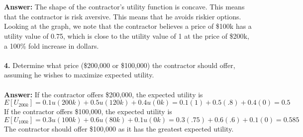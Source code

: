 \documentclass[12pt]{article}
\begin{document}
\\~\\
\textbf{Answer: } The shape of the contractor's utility function is concave. This means that the contractor is risk aversive. This means that he avoids riskier options. Looking at the graph, we note that the contractor believes a price of \$100k has a utility value of 0.75, which is close to the utility value of 1 at the price of \$200k, a 100\% fold increase in dollars. 
\\~\\
\textbf{4. } Determine what price (\$200,000 or \$100,000) the contractor should offer, assuming he wishes to maximize expected utility. 
\\~\\
\textbf{Answer: } If the contractor offers \$200,000, the expected utility is 
$$ E[U_{200k}] = 0.1u(200k) + 0.5u(120k) + 0.4u(0k) = 0.1(1) + 0.5(.8) + 0.4(0) = 0.5 $$ 
If the contractor offers \$100,000, the expected utility is 
$$ E[U_{100k}] = 0.3u(100k) + 0.6u(80k) + 0.1u(0k) = 0.3(.75) + 0.6(.6) + 0.1(0) = 0.585 $$ 
The contractor should offer \$100,000 as it has the greatest expected utility. 
\end{document}
